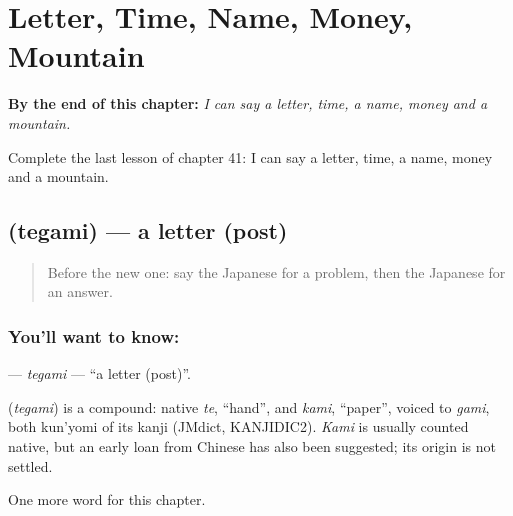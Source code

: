 
\chapter{Letter, Time, Name, Money, Mountain}
\label{ch:ja-letter-time-name-money-mountain}

\begin{chapteropening}
\textbf{By the end of this chapter:} \emph{I can say a letter, time, a name, money and a mountain.}

Complete the last lesson of chapter 41: I can say a letter, time, a name, money and a mountain.
\end{chapteropening}

\section[\texorpdfstring{\ja{てがみ} (tegami)}{てがみ (tegami)}]{ (tegami) — a letter (post)}

\label{lesson:JA-C41-tegami}



\begin{quote}
Before the new one: say the Japanese for a problem, then the Japanese for an answer.
\end{quote}

\subsection*{You'll want to know: }
\textbf{} — \emph{tegami} — \textquotedblleft{}a letter (post)\textquotedblright{}.

\begin{cousinweb}
\textbf{} (\emph{tegami}) is a compound: native \emph{te}, \textquotedblleft{}hand\textquotedblright{}, and \emph{kami}, \textquotedblleft{}paper\textquotedblright{}, voiced to \emph{gami}, both kun'yomi of its kanji (JMdict, KANJIDIC2). \emph{Kami} is usually counted native, but an early loan from Chinese has also been suggested; its origin is not settled.
\end{cousinweb}

\begin{grammarlens}[title={What you've built}]
One more word for this chapter.
\end{grammarlens}

